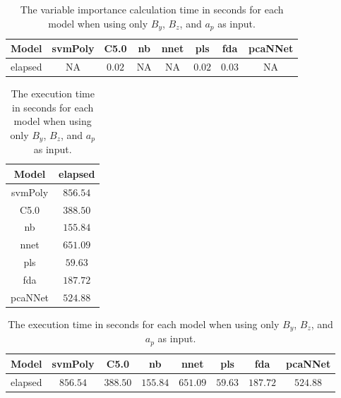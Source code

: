 \begin{table}[!ht]
	\centering
	\begin{tabular}{|c|c|c|c|c|c|c|c|}
		\hline
		Model & svmPoly & C5.0 & nb & nnet & pls & fda & pcaNNet \\ \hline
		elapsed & NA & $0.02$ & NA & NA & $0.02$ & $0.03$ & NA \\ \hline
	\end{tabular}
	\caption{The variable importance calculation time in seconds for each model when using only $B_{y}$, $B_{z}$, and $a_{p}$ as input.}
	\label{tab:time:reverse:yzap:importance}
\end{table}

\begin{table}[!ht]
	\centering
	\begin{tabular}{|c|c|}
		\hline
		Model & elapsed \\ \hline
		svmPoly & $856.54$ \\ \hline
		C5.0 & $388.50$ \\ \hline
		nb & $155.84$ \\ \hline
		nnet & $651.09$ \\ \hline
		pls & $59.63$ \\ \hline
		fda & $187.72$ \\ \hline
		pcaNNet & $524.88$ \\ \hline
	\end{tabular}
	\caption{The execution time in seconds for each model when using only $B_{y}$, $B_{z}$, and $a_{p}$ as input.}
	\label{tab:time:yzap:total}
\end{table}

\begin{table}[!ht]
	\centering
	\begin{tabular}{|c|c|c|c|c|c|c|c|}
		\hline
		Model & svmPoly & C5.0 & nb & nnet & pls & fda & pcaNNet \\ \hline
		elapsed & $856.54$ & $388.50$ & $155.84$ & $651.09$ & $59.63$ & $187.72$ & $524.88$ \\ \hline
	\end{tabular}
	\caption{The execution time in seconds for each model when using only $B_{y}$, $B_{z}$, and $a_{p}$ as input.}
	\label{tab:time:reverse:yzap:total}
\end{table}

